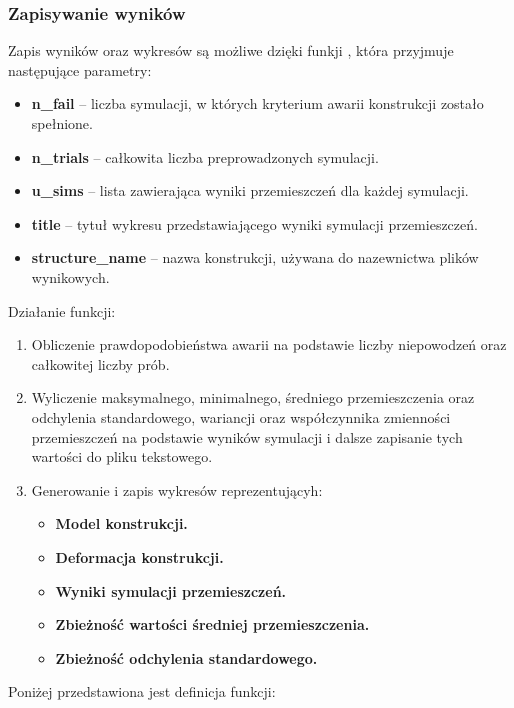 \subsubsection*{Zapisywanie wyników}

Zapis wyników oraz wykresów są możliwe dzięki funkji , która przyjmuje następujące parametry:
\begin{itemize}
    \item \textbf{n\_fail} – liczba symulacji, w których kryterium awarii konstrukcji zostało spełnione.
    \item \textbf{n\_trials} – całkowita liczba preprowadzonych symulacji.
    \item \textbf{u\_sims} – lista zawierająca wyniki przemieszczeń dla każdej symulacji.
    \item \textbf{title} – tytuł wykresu przedstawiającego wyniki symulacji przemieszczeń.
    \item \textbf{structure\_name} – nazwa konstrukcji, używana do nazewnictwa plików wynikowych.
\end{itemize}
Działanie funkcji:

\begin{enumerate}
    \item Obliczenie prawdopodobieństwa awarii na podstawie liczby niepowodzeń oraz całkowitej liczby prób.
    \item Wyliczenie maksymalnego, minimalnego, średniego przemieszczenia oraz odchylenia standardowego, wariancji oraz współczynnika zmienności przemieszczeń na podstawie wyników symulacji i dalsze zapisanie tych wartości do pliku tekstowego.
    \item Generowanie i zapis wykresów reprezentującyh:
    \begin{itemize}
        \item \textbf{Model konstrukcji.}
        \item \textbf{Deformacja konstrukcji.}
        \item \textbf{Wyniki symulacji przemieszczeń.}
        \item \textbf{Zbieżność wartości średniej przemieszczenia.}
        \item \textbf{Zbieżność odchylenia standardowego.}
    \end{itemize}
\end{enumerate}
Poniżej przedstawiona jest definicja funkcji:

